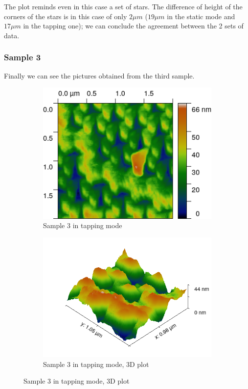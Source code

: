 \documentclass[11pt,a4paper]{article}
\begin{document}
The plot reminds even in this case a set of stars. The difference of height of the corners of the stars is in this case of only $2\mu m$ ($19\mu m$ in the static mode and $17\mu m$ in the tapping one); we can conclude the agreement between the 2 sets of data.

\subsubsection{Sample 3}
Finally we can see the pictures obtained from the third sample.
\begin{figure}[H]
\centering
\begin{subfigure}[b]{0.45\textwidth}
\includegraphics[width=\textwidth]{tm_sample3}
\caption{Sample 3 in tapping mode}
\label{fig:}
\end{subfigure}
\begin{subfigure}[b]{0.45\textwidth}
\includegraphics[width=\textwidth]{tm_sample3_3D}
\caption{Sample 3 in tapping mode, 3D plot}
\label{fig:}
\end{subfigure}
\end{figure}
\end{document}
